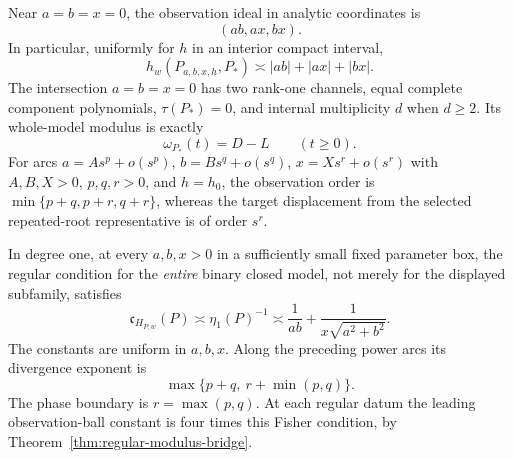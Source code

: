 \begin{theorem}
\label{thm:binary-collapse}
Near $a=b=x=0$, the observation ideal in analytic coordinates is
\begin{equation}\label{eq:binary-defect-ideal}
                  (ab,ax,bx).
\end{equation}
In particular, uniformly for $h$ in an interior compact interval,
\[
 h_w(P_{a,b,x,h},P_*)\asymp |ab|+|ax|+|bx|.
\]
The intersection $a=b=x=0$ has two rank-one channels, equal complete
component polynomials, $\tau(P_*)=0$, and internal multiplicity $d$
when $d\ge2$. Its whole-model modulus is exactly
\begin{equation}\label{eq:collapse-modulus}
                     \omega_{P_*}(t)=D-L\qquad(t\ge0).
\end{equation}
For arcs $a=A s^p+o(s^p)$, $b=B s^q+o(s^q)$,
$x=X s^r+o(s^r)$ with $A,B,X>0$, $p,q,r>0$, and $h=h_0$,
the observation order is
$\min\{p+q,p+r,q+r\}$, whereas the target displacement from the
selected repeated-root representative is of order $s^r$.

In degree one, at every $a,b,x>0$ in a sufficiently small fixed
parameter box, the regular condition for the \emph{entire} binary
closed model, not merely for the displayed subfamily, satisfies
\begin{equation}\label{eq:binary-condition}
 \mathfrak c_{H_{P,w}}(P)\asymp\eta_1(P)^{-1}
       \asymp \frac1{ab}+\frac1{x\sqrt{a^2+b^2}}.
\end{equation}
The constants are uniform in $a,b,x$. Along the preceding power arcs
its divergence exponent is
\begin{equation}\label{eq:binary-phase}
                 \max\{p+q,\ r+\min(p,q)\}.
\end{equation}
The phase boundary is $r=\max(p,q)$. At each regular datum the leading
observation-ball constant is four times this Fisher condition,
by Theorem~\ref{thm:regular-modulus-bridge}.
\end{theorem}
